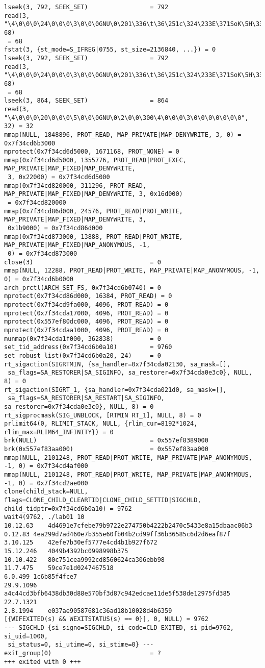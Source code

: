 \documentclass[12pt]{article}
\begin{document}
{\begin{lstlisting}[escapechar=!]
lseek(3, 792, SEEK_SET)                 = 792
read(3, "\4\0\0\0\24\0\0\0\3\0\0\0GNU\0\201\336\t\36\251c\324\233E\371SoK\5H\334"..., 68)
 = 68
fstat(3, {st_mode=S_IFREG|0755, st_size=2136840, ...}) = 0
lseek(3, 792, SEEK_SET)                 = 792
read(3, "\4\0\0\0\24\0\0\0\3\0\0\0GNU\0\201\336\t\36\251c\324\233E\371SoK\5H\334"..., 68)
 = 68
lseek(3, 864, SEEK_SET)                 = 864
read(3, "\4\0\0\0\20\0\0\0\5\0\0\0GNU\0\2\0\0\300\4\0\0\0\3\0\0\0\0\0\0\0", 32) = 32
mmap(NULL, 1848896, PROT_READ, MAP_PRIVATE|MAP_DENYWRITE, 3, 0) = 0x7f34cd6b3000
mprotect(0x7f34cd6d5000, 1671168, PROT_NONE) = 0
mmap(0x7f34cd6d5000, 1355776, PROT_READ|PROT_EXEC, MAP_PRIVATE|MAP_FIXED|MAP_DENYWRITE,
 3, 0x22000) = 0x7f34cd6d5000
mmap(0x7f34cd820000, 311296, PROT_READ, MAP_PRIVATE|MAP_FIXED|MAP_DENYWRITE, 3, 0x16d000)
 = 0x7f34cd820000
mmap(0x7f34cd86d000, 24576, PROT_READ|PROT_WRITE, MAP_PRIVATE|MAP_FIXED|MAP_DENYWRITE, 3,
 0x1b9000) = 0x7f34cd86d000
mmap(0x7f34cd873000, 13888, PROT_READ|PROT_WRITE, MAP_PRIVATE|MAP_FIXED|MAP_ANONYMOUS, -1,
 0) = 0x7f34cd873000
close(3)                                = 0
mmap(NULL, 12288, PROT_READ|PROT_WRITE, MAP_PRIVATE|MAP_ANONYMOUS, -1, 0) = 0x7f34cd6b0000
arch_prctl(ARCH_SET_FS, 0x7f34cd6b0740) = 0
mprotect(0x7f34cd86d000, 16384, PROT_READ) = 0
mprotect(0x7f34cd9fa000, 4096, PROT_READ) = 0
mprotect(0x7f34cda17000, 4096, PROT_READ) = 0
mprotect(0x557ef80dc000, 4096, PROT_READ) = 0
mprotect(0x7f34cdaa1000, 4096, PROT_READ) = 0
munmap(0x7f34cda1f000, 362838)          = 0
set_tid_address(0x7f34cd6b0a10)         = 9760
set_robust_list(0x7f34cd6b0a20, 24)     = 0
rt_sigaction(SIGRTMIN, {sa_handler=0x7f34cda02130, sa_mask=[],
 sa_flags=SA_RESTORER|SA_SIGINFO, sa_restorer=0x7f34cda0e3c0}, NULL, 8) = 0
rt_sigaction(SIGRT_1, {sa_handler=0x7f34cda021d0, sa_mask=[],
 sa_flags=SA_RESTORER|SA_RESTART|SA_SIGINFO, sa_restorer=0x7f34cda0e3c0}, NULL, 8) = 0
rt_sigprocmask(SIG_UNBLOCK, [RTMIN RT_1], NULL, 8) = 0
prlimit64(0, RLIMIT_STACK, NULL, {rlim_cur=8192*1024, rlim_max=RLIM64_INFINITY}) = 0
brk(NULL)                               = 0x557ef8389000
brk(0x557ef83aa000)                     = 0x557ef83aa000
mmap(NULL, 2101248, PROT_READ|PROT_WRITE, MAP_PRIVATE|MAP_ANONYMOUS, -1, 0) = 0x7f34cd4af000
mmap(NULL, 2101248, PROT_READ|PROT_WRITE, MAP_PRIVATE|MAP_ANONYMOUS, -1, 0) = 0x7f34cd2ae000
clone(child_stack=NULL, flags=CLONE_CHILD_CLEARTID|CLONE_CHILD_SETTID|SIGCHLD, 
child_tidptr=0x7f34cd6b0a10) = 9762
wait4(9762, ./lab01 10
10.12.63	4d4691e7cfebe79b9722e274750b4222b2470c5433e8a15dbaac06b3
0.12.83	4ea299d7ad460e7b355e60fb04b2cd99ff36b36585c6d2d6eaf87f
3.10.125	42efe7b30ef5777e4cd4b1b927f672
15.12.246	4049b4392bc0998998b375
10.10.422	80c751cea9992cd8560624ca306ebb98
11.7.475	59ce7e1d0247467518
6.0.499	1c6b85f4fce7
29.9.1096	a4c44cd3bfb6438db30d88e570bf3d87c942edcae11de5f538de12975fd385
22.7.1321	
2.8.1994	e037ae90587681c36ad18b10028d4b6359
[{WIFEXITED(s) && WEXITSTATUS(s) == 0}], 0, NULL) = 9762
--- SIGCHLD {si_signo=SIGCHLD, si_code=CLD_EXITED, si_pid=9762, si_uid=1000,
 si_status=0, si_utime=0, si_stime=0} ---
exit_group(0)                           = ?
+++ exited with 0 +++

\end{lstlisting}}
\end{document}
